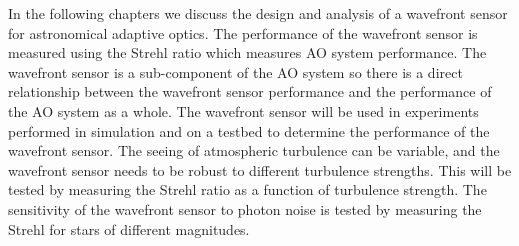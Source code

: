 In the following chapters we discuss the design and analysis of a wavefront sensor for astronomical adaptive optics. The performance of the wavefront sensor is measured using the Strehl ratio which measures AO system performance. The wavefront sensor is a sub-component of the AO system so there is a direct relationship between the wavefront sensor performance and the performance of the AO system as a whole. The wavefront sensor will be used in experiments performed in simulation and on a testbed to determine the performance of the wavefront sensor. The seeing of atmospheric turbulence can be variable, and the wavefront sensor needs to be robust to different turbulence strengths. This will be tested by measuring the Strehl ratio as a function of turbulence strength. The sensitivity of the wavefront sensor to photon noise is tested by measuring the Strehl for stars of different magnitudes. 





